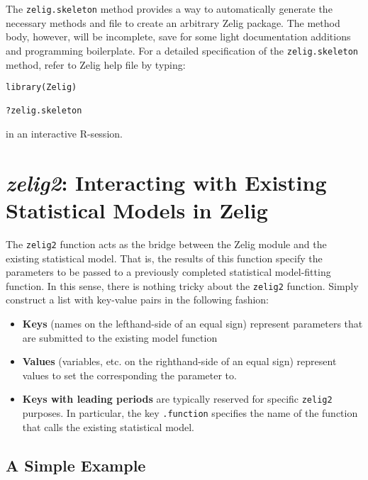 \documentclass{article}
\newcommand{\code}[1]{{\tt #1}}
\begin{document}
The \code{zelig.skeleton} method provides a way to automatically generate the necessary methods and file to create an arbitrary Zelig package. The method body, however, will be incomplete, save for some light documentation additions and programming boilerplate. For a detailed specification of the \code{zelig.skeleton} method, refer to Zelig help file by typing:

\begin{verbatim}
library(Zelig)

?zelig.skeleton
\end{verbatim}

{\noindent}in an interactive R-session.
 

\section{\emph{zelig2}: Interacting with Existing Statistical Models in Zelig}
\label{section:zelig2}

The \code{zelig2} function acts as the bridge between the Zelig module and the existing statistical model. That is, the results of this function specify the parameters to be passed to a previously completed statistical model-fitting function. In this sense, there is nothing tricky about the \code{zelig2} function. Simply construct a list with key-value pairs in the following fashion:

\begin{itemize}

  \item {\bf Keys} (names on the lefthand-side of an equal sign) represent
        parameters that are submitted to the existing model function

  \item {\bf Values} (variables, etc. on the righthand-side of an equal sign)
        represent values to set the corresponding the parameter to.
        
  \item {\bf Keys with leading periods} are typically reserved for specific
        \code{zelig2} purposes. In particular, the key \code{.function}
        specifies the name of the function that calls the existing statistical
        model.

\end{itemize}

\subsection{A Simple Example}
\end{document}
